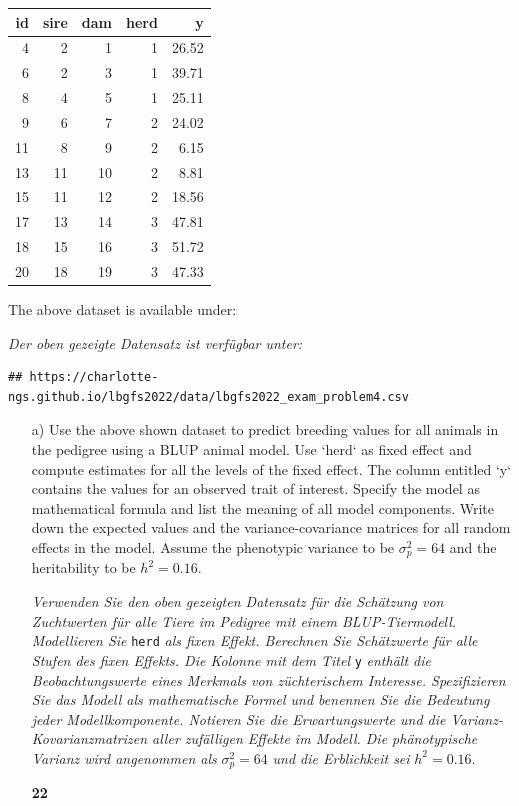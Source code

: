 \documentclass[
]{article}
\newcommand{\points}[1]
{\begin{flushright}\textbf{#1}\end{flushright}}
\begin{document}
\begin{longtable}[]{@{}rrrrr@{}}
\toprule()
id & sire & dam & herd & y \\
\midrule()
\endhead
4 & 2 & 1 & 1 & 26.52 \\
6 & 2 & 3 & 1 & 39.71 \\
8 & 4 & 5 & 1 & 25.11 \\
9 & 6 & 7 & 2 & 24.02 \\
11 & 8 & 9 & 2 & 6.15 \\
13 & 11 & 10 & 2 & 8.81 \\
15 & 11 & 12 & 2 & 18.56 \\
17 & 13 & 14 & 3 & 47.81 \\
18 & 15 & 16 & 3 & 51.72 \\
20 & 18 & 19 & 3 & 47.33 \\
\bottomrule()
\end{longtable}

The above dataset is available under:

\textit{Der oben gezeigte Datensatz ist verfügbar unter:}

\begin{verbatim}
## https://charlotte-ngs.github.io/lbgfs2022/data/lbgfs2022_exam_problem4.csv
\end{verbatim}

\vspace{3ex}
\begin{enumerate}
\item[a)]  Use the above shown dataset to predict breeding values for all animals in the pedigree using a BLUP animal model. Use `herd` as fixed effect and compute estimates for all the levels of the fixed effect. The column entitled `y` contains the values for an observed trait of interest. Specify the model as mathematical formula and list the meaning of all model components. Write down the expected values and the variance-covariance matrices for all random effects in the model. Assume the phenotypic variance to be $\sigma_p^2 = 64$ and the heritability to be $h^2 = 0.16$.

\textit{Verwenden Sie den oben gezeigten Datensatz für die Schätzung von Zuchtwerten für alle Tiere im Pedigree mit einem BLUP-Tiermodell. Modellieren Sie } \verb+herd+ \textit{als fixen Effekt. Berechnen Sie Schätzwerte für alle Stufen des fixen Effekts. Die Kolonne mit dem Titel} \verb+y+ \textit{enthält die Beobachtungswerte eines Merkmals von züchterischem Interesse. Spezifizieren Sie das Modell als mathematische Formel und benennen Sie die Bedeutung jeder Modellkomponente. Notieren Sie die Erwartungswerte und die Varianz-Kovarianzmatrizen aller zufälligen Effekte im Modell. Die phänotypische Varianz wird angenommen als } $\sigma_p^2 = 64$ \textit{ und die Erblichkeit sei } $h^2 = 0.16$.
\points{22}
\end{enumerate}
\end{document}
